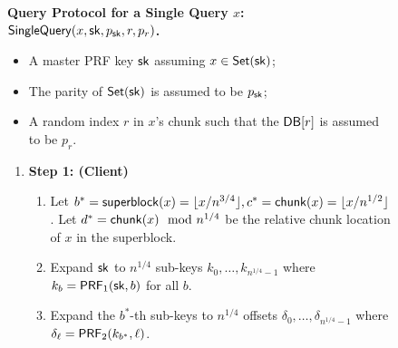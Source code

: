 \begin{figure}[p]
    
    \begin{minipage}{\textwidth}
        \begin{mdframed}
            \label{alg:one-query}
            \begin{center}
                {\bf Query Protocol for a Single Query $x$: $\mathsf{SingleQuery}(x,
                \mathsf{sk}, p_{\mathsf{sk}}, r, p_r)$.
                }
            \end{center}
            
            \begin{itemize}
                \item A master PRF key $\mathsf{sk}$ assuming $x\in \mathsf{Set}(\mathsf{sk})$;
                \item The parity of $\mathsf{Set}(\mathsf{sk})$ is assumed to be $p_{\mathsf{sk}}$;
                \item A random index $r$ in $x$'s chunk such that the  $\mathsf{DB}[r]$
                is assumed to be $p_r$.
            \end{itemize}
            
            \begin{enumerate}[leftmargin=5mm,itemsep=1pt]
                \item 
                {\bf Step 1: (Client)}

                \begin{enumerate}[leftmargin=5mm,itemsep=1pt]
                        
                        \item Let $b^*={\sf superblock}(x)=\lfloor x/n^{3/4}
                        \rfloor, c^* = {\sf chunk}(x)=\lfloor x/n^{1/2}
                        \rfloor$. Let $d^*=\mathsf{chunk}(x)\mod n^{1/4}$ be the
                        relative chunk location of $x$ in the superblock. 
                        

                        \item Expand $\mathsf{sk}$ to $n^{1/4}$ sub-keys $k_{
                        0},\dots,k_{n^{1/4}-1}$ where $k_{b}=\mathsf{PRF}_1(\mathsf{sk}, b)$ for
                        all $b$.
                    
                        \item Expand the $b^*$-th sub-keys to $n^{1/4}$ offsets
                        $\delta_{0},\dots,\delta_{n^{1/4}-1}$ where
                        $\delta_{\ell}=\mathsf{PRF}_2(k_{b^*}, \ell)$.
                        

\end{enumerate}
\end{enumerate}
\end{mdframed}
\end{minipage}
\end{figure}
